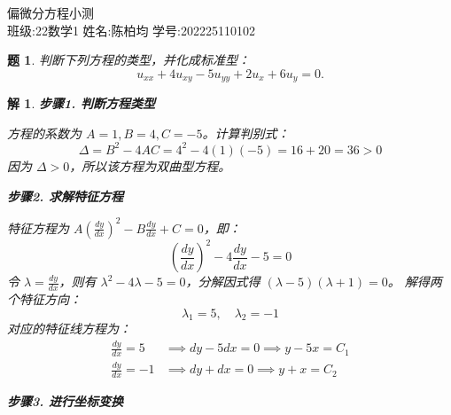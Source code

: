 \documentclass[12pt,a4paper]{article}
\newtheorem{problem}{题}
\newtheorem*{solution}{解}
\begin{document}
	
	\begin{center}
		\LARGE 偏微分方程小测 \\
		\vspace{0.5cm}
		\large 班级:22数学1 \quad 姓名:陈柏均 \quad 学号:202225110102
	\end{center}
	
	
	\begin{problem}
		判断下列方程的类型，并化成标准型：
		\[
		u_{xx} + 4u_{xy} - 5u_{yy} + 2u_x + 6u_y = 0.
		\]
	\end{problem}
		\hrulefill
	\begin{solution}
		\textbf{步骤1. 判断方程类型}
		
		\noindent
		方程的系数为 $A=1, B=4, C=-5$。计算判别式：
		\[
		\Delta = B^2 - 4AC = 4^2 - 4(1)(-5) = 16 + 20 = 36 > 0
		\]
		因为 $\Delta > 0$，所以该方程为双曲型方程。
		
		\hrulefill
		
		\textbf{步骤2. 求解特征方程}
		
		\noindent
		特征方程为 $A \left(\frac{dy}{dx}\right)^2 - B \frac{dy}{dx} + C = 0$，即：
		\[
		\left(\frac{dy}{dx}\right)^2 - 4\frac{dy}{dx} - 5 = 0
		\]
		令 $\lambda = \frac{dy}{dx}$，则有 $\lambda^2 - 4\lambda - 5 = 0$，分解因式得 $(\lambda - 5)(\lambda + 1) = 0$。
		解得两个特征方向：
		\[
		\lambda_1 = 5, \quad \lambda_2 = -1
		\]
		对应的特征线方程为：
		\begin{align*}
			\frac{dy}{dx} = 5 &\implies dy - 5dx = 0 \implies y - 5x = C_1 \\
			\frac{dy}{dx} = -1 &\implies dy + dx = 0 \implies y + x = C_2
		\end{align*}
		
		\hrulefill
		
		\textbf{步骤3. 进行坐标变换}
		

\end{solution}
\end{document}
